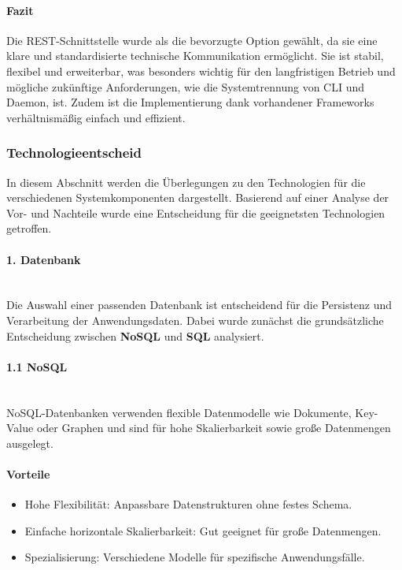 \documentclass[a4paper,12pt]{report}
\begin{document}
    \paragraph{Fazit}
    Die REST-Schnittstelle wurde als die bevorzugte Option gewählt, da sie eine klare und standardisierte technische Kommunikation ermöglicht.
    Sie ist stabil, flexibel und erweiterbar, was besonders wichtig für den langfristigen Betrieb und mögliche zukünftige Anforderungen, wie die Systemtrennung von CLI und Daemon, ist.
    Zudem ist die Implementierung dank vorhandener Frameworks verhältnismäßig einfach und effizient.
    \clearpage

    \subsubsection{Technologieentscheid}
    In diesem Abschnitt werden die Überlegungen zu den Technologien für die verschiedenen Systemkomponenten dargestellt.
    Basierend auf einer Analyse der Vor- und Nachteile wurde eine Entscheidung für die geeignetsten Technologien getroffen.

    \paragraph{1. Datenbank}\mbox{}\\
    Die Auswahl einer passenden Datenbank ist entscheidend für die Persistenz und Verarbeitung der Anwendungsdaten.
    Dabei wurde zunächst die grundsätzliche Entscheidung zwischen \textbf{NoSQL} und \textbf{SQL} analysiert.

    \paragraph{1.1 NoSQL}\mbox{}\\
    NoSQL-Datenbanken verwenden flexible Datenmodelle wie Dokumente, Key-Value oder Graphen und sind für hohe Skalierbarkeit sowie große Datenmengen ausgelegt.

    \paragraph{Vorteile}
    \begin{itemize}
        \item Hohe Flexibilität: Anpassbare Datenstrukturen ohne festes Schema.
        \item Einfache horizontale Skalierbarkeit: Gut geeignet für große Datenmengen.
        \item Spezialisierung: Verschiedene Modelle für spezifische Anwendungsfälle.
    \end{itemize}
\end{document}
